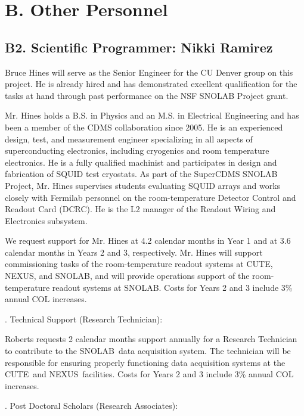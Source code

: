 \documentclass[11pt]{article}
\def\ni{\noindent}
\def\ss{\smallskip}
\newcommand{\SNOLAB}{{\small SNOLAB}}
\newcommand{\NEXUS}{{\small NEXUS}}
\newcommand{\CUTE}{{\small CUTE}}
\begin{document}
\section*{\bf B. Other Personnel}

\subsection*{B2. Scientific Programmer: Nikki Ramirez}

Bruce Hines will serve as the Senior Engineer for the CU Denver group on this project. He is already hired and has demonstrated excellent qualification for the tasks at hand through past performance on the NSF SNOLAB Project grant. 

Mr. Hines holds a B.S. in Physics and an M.S. in Electrical Engineering and has been a member of the CDMS collaboration since 2005.  He is an experienced design, test, and measurement engineer specializing in all aspects of superconducting electronics, including cryogenics and room temperature electronics. He is a fully qualified machinist and participates in design and fabrication of SQUID test cryostats. As part of the SuperCDMS SNOLAB Project, Mr. Hines supervises students evaluating SQUID arrays and works closely with Fermilab personnel on the room-temperature Detector Control and Readout Card (DCRC). He is the L2 manager of the Readout Wiring and Electronics subsystem.

We request support for Mr. Hines at 4.2 calendar months in Year 1 and at 3.6 calendar months in Years 2 and 3, respectively. Mr. Hines will support commissioning tasks of the room-temperature readout systems at \CUTE, \NEXUS, and \SNOLAB, and will provide operations support of the room-temperature readout systems at \SNOLAB. Costs for Years 2 and 3 include 3\% annual  COL increases. 

\ss \ni 3.  Technical Support (Research Technician): 

Roberts requests 2 calendar months support annually for a Research Technician to contribute to the \SNOLAB\ data acquisition system. The  technician will be responsible for ensuring properly functioning data acquisition systems at the \CUTE\ and \NEXUS\ facilities. Costs for Years 2 and 3 include 3\% annual  COL increases. 


\ss \ni 3.  Post Doctoral Scholars (Research Associates): 
\end{document}
